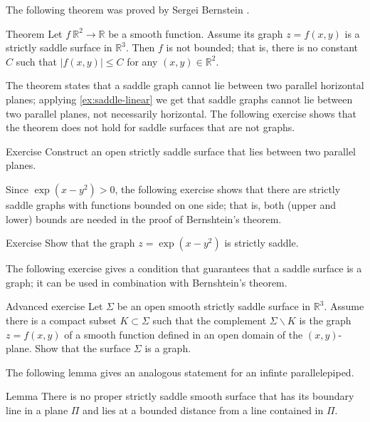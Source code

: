 The following theorem was proved by Sergei Bernstein \cite{bernstein}.

\begin{thm}{Theorem}\label{thm:bernshtein}
Let $f\:\mathbb{R}^2\to\mathbb{R}$ be a smooth function.
Assume its graph $z=f(x,y)$ is a strictly saddle surface in $\mathbb{R}^3$.
Then $f$ is not bounded;
that is, there is no constant $C$ such that 
$|f(x,y)|\le C$ for any $(x,y)\in\mathbb{R}^2$.
\end{thm}

The theorem states that a saddle graph cannot lie between two parallel horizontal planes;
applying \ref{ex:saddle-linear} we get that saddle graphs cannot lie between two parallel planes,
not necessarily horizontal.
The following exercise shows that the theorem does not hold for saddle surfaces that are not graphs.


\begin{thm}{Exercise}\label{ex:between-parallels}
Construct an open strictly saddle surface that lies between two parallel planes.
\end{thm}

Since $\exp(x-y^2)>0$,
the following exercise shows that there are strictly saddle graphs with functions bounded on one side;
that is, both (upper and lower) bounds are needed in the proof of Bernshtein's theorem.

\begin{thm}{Exercise}\label{ex:one-side-bernshtein}
Show that the graph
$z=\exp(x-y^2)$
is strictly saddle.
\end{thm}

The following exercise gives a condition that guarantees that a saddle surface is a graph;
it can be used in combination with Bernshtein's theorem.

\begin{thm}{Advanced exercise}\label{ex:saddle-graph}
Let $\Sigma$ be an open smooth strictly saddle surface in $\mathbb{R}^3$.
Assume there is a compact subset $K\subset \Sigma$ such that the complement $\Sigma\backslash K$ is the graph $z=f(x,y)$ of a smooth function defined in an open domain of the $(x,y)$-plane.
Show that the surface $\Sigma$ is a graph.
\end{thm}

The following lemma gives an analogous statement for an infinte parallelepiped.

\begin{thm}{Lemma}\label{lem:region}
There is no proper strictly saddle smooth surface that has its boundary line in a plane $\Pi$ 
and lies at a bounded distance from a line contained in $\Pi$.
\end{thm}


